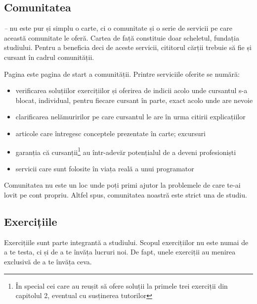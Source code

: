 
{}
\subsection*{Comunitatea}
\textit{{\thetitle} -- {\thesubtitle}}
nu este pur și simplu o carte, ci o comunitate și o serie de servicii pe care
această comunitate le oferă. Cartea de față constituie doar scheletul, fundația
studiului. Pentru a beneficia deci de aceste servicii, cititorul cărții
trebuie să fie și cursant în cadrul comunității.

Pagina {\phpro} este pagina de start a comunității. Printre serviciile oferite se numără:
\begin{itemize}
    \item verificarea soluțiilor exercițiilor și oferirea de indicii acolo unde cursantul s-a blocat, individual,
pentru fiecare cursant în parte, exact acolo unde are nevoie
    \item clarificarea nelămuririlor pe care cursantul le are în urma citirii explicațiilor
    \item articole care întregesc conceptele prezentate în carte; excursuri
    \item garanția că cursanții\footnote{În special cei care au reușit
să ofere soluții la primele trei exerciții din capitolul 2, eventual cu susținerea
tutorilor} au într-adevăr potențialul de a deveni profesioniști
    \item servicii care sunt folosite în viața reală a unui programator
\end{itemize}

Comunitatea {\phpro} nu este un loc unde poți primi ajutor la
problemele de care te-ai lovit pe cont propriu. Altfel spus, comunitatea
noastră este strict una de studiu.

{}
\subsection*{Exercițiile}

Exercițiile sunt parte integrantă a studiului. Scopul exercițiilor nu
este numai de a te testa, ci și de a te învăța lucruri noi. De fapt,
unele exerciții au menirea exclusivă de a te învăța ceva.

